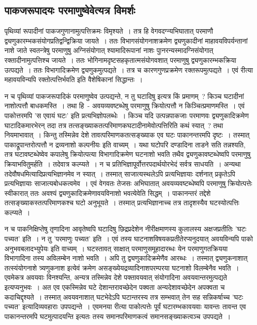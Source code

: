 		\subsection{पाकजरूपादयः परमाणुष्वेवेत्यत्र विमर्शः}

		पृथिव्यां रूपादीनां पाकजगुणानामुत्पत्तिक्रमः विमृश्यते~। तत्र हि वेगवदग्न्यभिघातात् परमाणौ द्व्यणुकारम्भकसंयोगप्रतिद्वन्द्विक्रिया जायते~। ततः विभागसंयोगनाशक्रमेण द्व्यणुकादीनां माहावयविपर्यन्तानां नाशे जाते स्वतन्त्रेषु परमाणुषु अग्निसंयोगात् श्यामादिरूपानां नाशः पाुनरन्यस्मादग्निसंयोगात् रक्तादीनामुत्पत्तिश्च जायते~। ततः भोगिनामदृष्टसहकृतात्मसंयोगवशात् परमाणुषु द्व्यणुकारम्भकक्रिया उत्पद्यते~। ततः विभागादिक्रमेण द्व्यणुकमुत्पद्यते~। तत्र च कारणगुणप्रक्रमेण रक्तरूपमुत्पद्यते~। एवं रीत्या महावयविन्यपि रक्तोत्पत्तिर्भवति इति वैशेषिकानां सिद्धान्तः~।

		न च पृथिव्यां पाकजरूपादिकं परमाणुष्वेव उत्पद्यन्ते, न तु घटादिषु इत्यत्र किं प्रमाणम्~? किञ्च घटादीनां नाशोत्पत्तौ बाधकमस्ति~। तथा हि~- अवयव्यवष्टब्धेषु परमाणुषु क्रियोत्पत्तौ न किञ्चित्प्रमाणमस्ति~। एवं पाकोत्तरमपि 'स एवायं घटः' इति प्रत्यभिज्ञोपलब्धेः~। किञ्च यदि उत्पन्नपाकजाः परमाणवः द्व्यणुकादिक्रमेण घाटादिकमारभेरन् तदा तत्र तत्सङ्ख्याकतत्परिमाणकघटादीनामेवोत्पत्तिरिति कथं स्यात्~? तथा नियमाभावात्~। किन्तु तस्मिन्नेव देशे तावत्परिमाणकतत्सङ्ख्याक एव घटः पाकानन्तरमपि दृष्टः~। तस्मात् पाकाद्रूपान्तरोत्पत्तौ न द्रव्यनाशो कल्पनीयः इति वाच्यम्~। यथा घटोपरि दण्डादिना ताडने सति तन्नश्यति, तत्र घटावष्टब्धेष्वेव कपालेषु क्रियोत्पत्या विभागादिक्रमेण घटनाशो भवति तथैव द्व्यणुकावष्टब्धेष्वपि परमाणुषु क्रियाभवितुमर्हति~। तदेवात्र कल्प्यते~। न च प्रतिभिज्ञापूर्वोत्तरपदार्थयोरभेदं सर्वत्र साधयति~। अन्यथा तदेवौषधमित्यादिप्रत्यभिज्ञानमेव न स्यात्~। तस्मात् साजात्यस्थलेऽपि प्रत्यभिज्ञायाः दर्शनात् प्रकृतेऽपि प्रत्यभिज्ञायाः साजात्यबोधकत्वमेव~। एवं वेगवतः तेजसः अभिघातात् अवयव्यवष्टब्धेष्वपि परमाणुषु क्रियोत्पत्तेः स्वीकारात् ततः अवश्यं द्व्यणुकादिक्रमेणावयविनाशो भवत्येवेति सिद्धम्~। पाकानन्तरं तद्देशे तत्सङ्ख्याकस्तत्परिमाणकश्च घटो अनुभूयते~। तस्मात् प्रत्यभिज्ञानाच्च तत्र तादृशस्यैव घटस्योत्पत्तिः कल्प्यते~।

		न च पाकनिक्षिप्तेषु तृणादिना आवृतेष्वपि घटादिषु छिद्रप्रदेशेन नीरीक्षमाणस्य कुलालस्य अक्षजप्रतीतिः 'घटः पच्यत' इति~। न तु 'परमाणुः पच्यत' इति~। एवं तस्य घाटनाशविषयकप्रतीतेरप्यनुदयात् अवयविन्यपि पाको अनुभवबलादभ्युपेयः इति वाच्यम्~। घटस्तावत् साक्षात् परमाणुसमूहादारब्धः येन परमाणुगतक्रियया विभागादिना तस्य अविलम्बेन नाशो भवति~। अपि तु द्व्यणुकादिक्रमेणैव आरब्धः~। तस्मात् द्व्यणुकनाशात् तत्स्यंयोगनाशे त्र्यणुकनाश इत्येवं क्रमेण असङ्ख्येयद्रव्यादिनाशपरम्परया घटनाशो विलम्बेनैव भवति~। एवमेकत्र अवयवाः विनश्यन्ति, अन्यत्र तस्मिन्नेव देशे पक्तावयवात् संयोगादिना अवयवान्तरमुत्पद्यते इत्यप्यनुभवः~। अत एव एकस्मिन्नेव घटे देशान्तरावच्छेदेन पक्वता अन्यदेशावच्छेदेन अपक्वता च कदाचिद्दृश्यते~। तस्मात् अवयवनाशात् घटभेदेऽपि घटान्तरस्य तत्र सम्भवात् तेन सह सन्निकर्षाच्च 'घटः पच्यत' इत्यादिव्यवहाराः उपपद्यन्ते~। एवमनया रीत्या पाकोत्पत्तेः पूर्वं घटारम्भकावयवाः यावन्तः तावन्त एव पाकानन्तरमपि घटमुत्पादयन्ति इत्यतः तस्य समानपरिमाणकत्वं समानसङ्ख्याकत्वञ्च उपपद्यते~।

